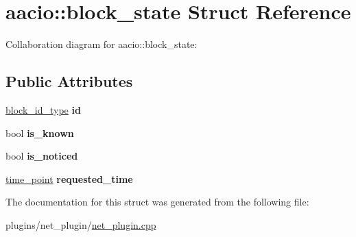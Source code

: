 \hypertarget{structaacio_1_1block__state}{}\section{aacio\+:\+:block\+\_\+state Struct Reference}
\label{structaacio_1_1block__state}


Collaboration diagram for aacio\+:\+:block\+\_\+state\+:
\subsection*{Public Attributes}
\begin{DoxyCompactItemize}
\item 
\mbox{\label{structaacio_1_1block__state_ae2193fc7c4b0440d7f41e63d39f6d42c}} 
\mbox{\hyperlink{classfc_1_1sha256}{block\+\_\+id\+\_\+type}} {\bfseries id}
\item 
\mbox{\label{structaacio_1_1block__state_ac7c26f33196cdb67ebf8c6c10fe5f517}} 
bool {\bfseries is\+\_\+known}
\item 
\mbox{\label{structaacio_1_1block__state_a10ba545dbec0291d11293c791823a97b}} 
bool {\bfseries is\+\_\+noticed}
\item 
\mbox{\label{structaacio_1_1block__state_a46da0ba6ec11be28c19d10d18fe042b1}} 
\mbox{\hyperlink{classfc_1_1time__point}{time\+\_\+point}} {\bfseries requested\+\_\+time}
\end{DoxyCompactItemize}


The documentation for this struct was generated from the following file\+:\begin{DoxyCompactItemize}
\item 
plugins/net\+\_\+plugin/\mbox{\hyperlink{net__plugin_8cpp}{net\+\_\+plugin.\+cpp}}\end{DoxyCompactItemize}
